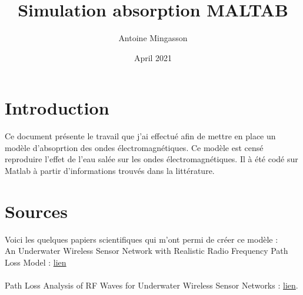 \documentclass{article}
\title{Simulation absorption MALTAB}
\author{Antoine Mingasson}
\date{April 2021}
\begin{document}
\maketitle

\section{Introduction}
Ce document présente le travail que j'ai effectué afin de mettre en place un modèle d'absoprtion des ondes électromagnétiques. Ce modèle est censé reproduire l'effet de l'eau salée sur les ondes électromagnétiques. Il à été codé sur Matlab à partir d'informations trouvés dans la littérature. 

\section{Sources}
Voici les quelques papiers scientifiques qui m'ont permi de créer ce modèle :\\
An Underwater Wireless Sensor Network with Realistic Radio
Frequency Path Loss Model : \href{https://seafile.lirmm.fr/d/fc60846874b44333ae2f/files/?p=\%2FRF\%2Fchannel\%20characterization\%2Fin\%20salted\%20water\%2F2013_508708.pdf}{lien}\\
\\
Path Loss Analysis of RF Waves for Underwater 
Wireless Sensor Networks : \href{https://seafile.lirmm.fr/d/fc60846874b44333ae2f/files/?p=\%2FRF\%2Fchannel\%20characterization\%2Fin\%20salted\%20water\%2F08284460.pdf}{lien}.\\
\end{document}
